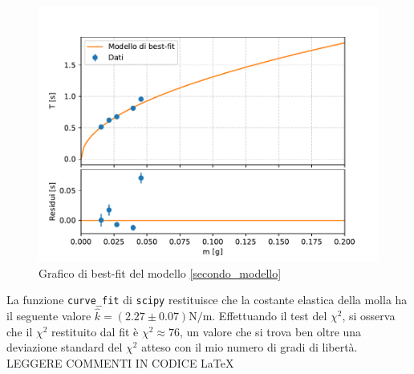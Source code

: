 \documentclass{article}
\begin{document}
\begin{figure}[H]
	\centering
	\includegraphics[scale=0.50]{Modello_best_fit_k_residui.pdf}
	\caption{Grafico di best-fit del modello \ref{secondo_modello}}
\end{figure}


\noindent La funzione \texttt{curve\_fit} di \texttt{scipy} restituisce che la costante elastica della molla ha il seguente valore $\hat{k} = (2.27 \pm 0.07) \si{\newton\per\meter}$. 
Effettuando il test del $\chi^2$, si osserva che il $\chi^2$ restituito dal fit è $\chi^2 \approx 76$, un valore che si trova ben oltre una deviazione standard del $\chi^2$ atteso con il mio numero di gradi di libertà. \\
LEGGERE COMMENTI IN CODICE \LaTeX
%
%
%
\end{document}
